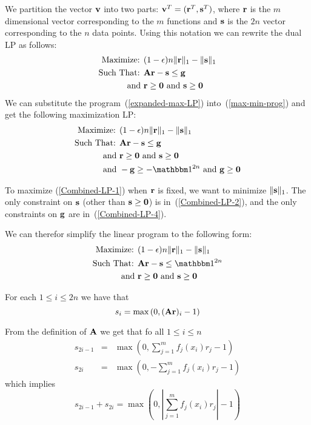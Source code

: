 \documentclass{article}[12pt]
\begin{document}
We partition the vector $\mathbf{v}$ into two parts: $\mathbf{v}^T = (\mathbf{r}^T,\mathbf{s}^T)$,
where $\mathbf{r}$ is the $m$ dimensional vector corresponding to the $m$
functions and $\mathbf{s}$ is the $2n$ vector corresponding to the $n$ data
points.  Using this notation we can rewrite the dual LP as follows:
\begin{eqnarray}
\mbox{Maximize: }& (1-\epsilon)n \|\mathbf{r}\|_1  - \| \mathbf{s} \|_1 \label{expanded-max-LP}\\
\mbox{Such That: }& \mathbf{A} \mathbf{r}  - \mathbf{s} \leq \mathbf{g} \notag \\
\mbox{ and } & \mathbf{r} \geq \mathbf{0} \mbox{ and } \mathbf{s} \geq \mathbf{0} \notag
\end{eqnarray}
We can substitute the program~(\ref{expanded-max-LP})
into~(\ref{max-min-prog}) and get the following maximization LP:
\begin{eqnarray}
\mbox{Maximize: }& (1-\epsilon)n \|\vr\|_1  - \| \vs \|_1 \label{Combined-LP-1}\\
\mbox{Such That: }& \vA \vr  - \vs \leq \vg  \label{Combined-LP-2}\\
\mbox{ and } & \vr \geq \vzero \mbox{ and } \vs \geq \vzero \label{Combined-LP-3} \\
\mbox{ and } &  -\vg \geq -\ones{2n} \mbox{ and } \vg \geq \vzero \label{Combined-LP-4}
\end{eqnarray}

To maximize (\ref{Combined-LP-1}) when $\mathbf{r}$ is fixed, we want to
minimize $\|\mathbf{s}\|_1$. The only constraint on $\mathbf{s}$ (other than $\mathbf{s}
\geq \mathbf{0}$) is in~(\ref{Combined-LP-2}), and the only constraints on
$\mathbf{g}$ are in~(\ref{Combined-LP-4}).

We can therefor simplify the linear program to the following form:
\begin{eqnarray}
\mbox{Maximize: }& (1-\epsilon)n \|\vr\|_1  - \| \vs \|_1 \label{condensed-LP-1}\\
\mbox{Such That: }& \vA \vr  - \vs \leq \ones{2n}  \label{Condensed-LP-2}\\
\mbox{ and } & \vr \geq \vzero \mbox{ and } \vs \geq \vzero \label{Condensed-LP-3} \\
\end{eqnarray}

For each $1 \leq i \leq 2n$ we have that
\[
s_i = \max \left(0,(\mathbf{A} \mathbf{r})_i -1 \right)
\]

From the definition of $\mathbf{A}$ we get that fo all $1 \leq i \leq n$
\begin{eqnarray*}
s_{2i-1} &=& \max \left(0,\sum_{j=1}^m f_j(x_i) r_j -1 \right) \\
s_{2i} &=& \max \left(0,-\sum_{j=1}^m f_j(x_i) r_j -1 \right)
\end{eqnarray*}
which implies 
\[
s_{2i-1}+s_{2i} = \max \left(0,\left| \sum_{j=1}^m f_j(x_i) r_j \right| -1 \right)
\]
\end{document}
